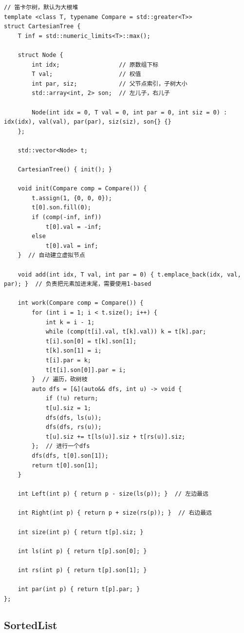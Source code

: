 \documentclass[UTF8,twoside]{ctexart}
\begin{document}
\begin{lstlisting}
// 笛卡尔树，默认为大根堆
template <class T, typename Compare = std::greater<T>>
struct CartesianTree {
    T inf = std::numeric_limits<T>::max();

    struct Node {
        int idx;                 // 原数组下标
        T val;                   // 权值
        int par, siz;            // 父节点索引，子树大小
        std::array<int, 2> son;  // 左儿子，右儿子

        Node(int idx = 0, T val = 0, int par = 0, int siz = 0) : idx(idx), val(val), par(par), siz(siz), son{} {}
    };

    std::vector<Node> t;

    CartesianTree() { init(); }

    void init(Compare comp = Compare()) {
        t.assign(1, {0, 0, 0});
        t[0].son.fill(0);
        if (comp(-inf, inf))
            t[0].val = -inf;
        else
            t[0].val = inf;
    }  // 自动建立虚拟节点

    void add(int idx, T val, int par = 0) { t.emplace_back(idx, val, par); }  // 负责把元素加进末尾，需要使用1-based

    int work(Compare comp = Compare()) {
        for (int i = 1; i < t.size(); i++) {
            int k = i - 1;
            while (comp(t[i].val, t[k].val)) k = t[k].par;
            t[i].son[0] = t[k].son[1];
            t[k].son[1] = i;
            t[i].par = k;
            t[t[i].son[0]].par = i;
        }  // 遍历，砍树枝
        auto dfs = [&](auto&& dfs, int u) -> void {
            if (!u) return;
            t[u].siz = 1;
            dfs(dfs, ls(u));
            dfs(dfs, rs(u));
            t[u].siz += t[ls(u)].siz + t[rs(u)].siz;
        };  // 进行一个dfs
        dfs(dfs, t[0].son[1]);
        return t[0].son[1];
    }

    int Left(int p) { return p - size(ls(p)); }  // 左边最远

    int Right(int p) { return p + size(rs(p)); }  // 右边最远

    int size(int p) { return t[p].siz; }

    int ls(int p) { return t[p].son[0]; }

    int rs(int p) { return t[p].son[1]; }

    int par(int p) { return t[p].par; }
};
\end{lstlisting}
\subsection{SortedList}
\end{document}
